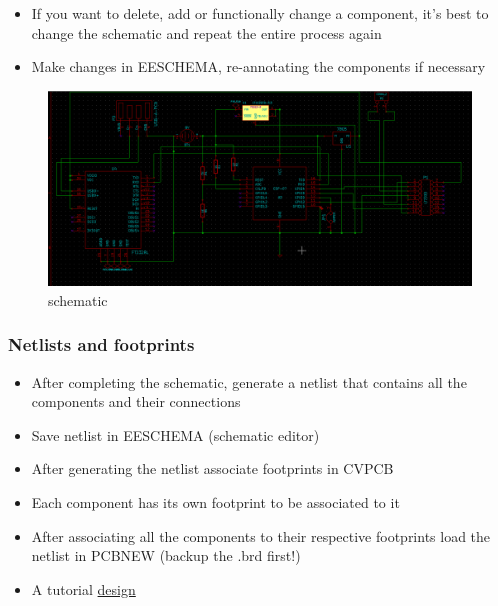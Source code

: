 \documentclass[16pt]{article}
\begin{document}
\begin{itemize}

\item
  If you want to delete, add or functionally change a component, it's
  best to change the schematic and repeat the entire process again
\item
  Make changes in EESCHEMA, re-annotating the components if necessary
  \vspace{0.2cm}
\end{itemize}


\begin{figure}

\includegraphics[width=1.2\textwidth]{images/schema.png}
\caption{schematic}
\end{figure}
\vspace{0.4cm}



\subsubsection{Netlists and
footprints}


\begin{itemize}

\item
  After completing the schematic, generate a netlist that contains all
  the components and their connections
\item
  Save netlist in EESCHEMA (schematic editor)
\item
  After generating the netlist associate footprints in CVPCB
\item
  Each component has its own footprint to be associated to it
\item
  After associating all the components to their respective footprints
  load the netlist in PCBNEW (backup the .brd first!)
\item
  A tutorial
 {\color{red}\href{http://store.curiousinventor.com/guides/kicad/schematic_to_layout}{design}}
\end{itemize}
\end{document}
